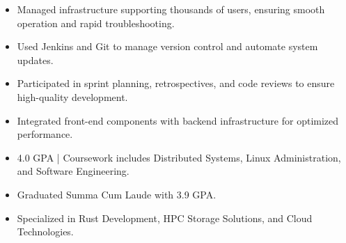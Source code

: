\par\smallskip
\noindent
\begin{minipage}{20cm}
  \begin{minipage}{9.75cm}
    \begin{itemize}
      \item Managed infrastructure supporting thousands of users, ensuring smooth operation and rapid troubleshooting.
      \item Used Jenkins and Git to manage version control and automate system updates.
    \end{itemize}
  \end{minipage}
  \hfill
  \begin{minipage}{9.75cm}
    \begin{itemize}
      \item Participated in sprint planning, retrospectives, and code reviews to ensure high-quality development.
      \item Integrated front-end components with backend infrastructure for optimized performance.
    \end{itemize}
  \end{minipage}
\end{minipage}
\par\smallskip
\divider

\begin{itemize}
  \item 4.0 GPA | Coursework includes Distributed Systems, Linux Administration, and Software Engineering.
\end{itemize}
\divider

\begin{itemize}
  \item Graduated Summa Cum Laude with 3.9 GPA.
  \item Specialized in Rust Development, HPC Storage Solutions, and Cloud Technologies.
\end{itemize}

\noindent
\begin{minipage}{20cm}
\end{minipage}


